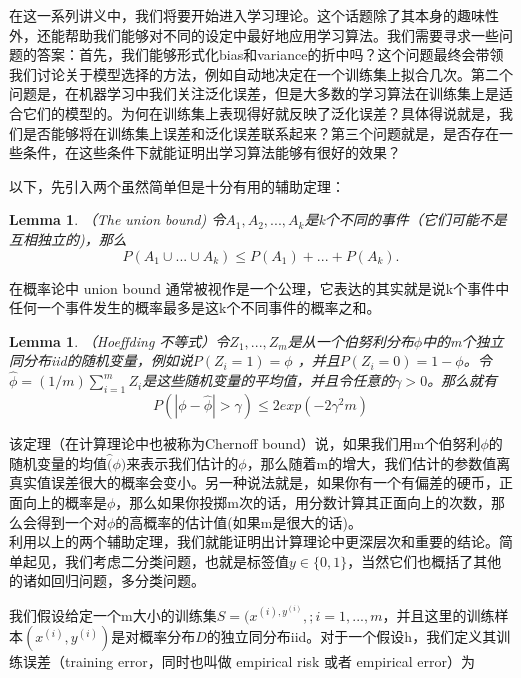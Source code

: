 \documentclass[UTF8]{ctexart}
\begin{document}
在这一系列讲义中，我们将要开始进入学习理论。这个话题除了其本身的趣味性外，还能帮助我们能够对不同的设定中最好地应用学习算法。我们需要寻求一些问题的答案：首先，我们能够形式化bias和variance的折中吗？这个问题最终会带领我们讨论关于模型选择的方法，例如自动地决定在一个训练集上拟合几次。第二个问题是，在机器学习中我们关注泛化误差，但是大多数的学习算法在训练集上是适合它们的模型的。为何在训练集上表现得好就反映了泛化误差？具体得说就是，我们是否能够将在训练集上误差和泛化误差联系起来？第三个问题就是，是否存在一些条件，在这些条件下就能证明出学习算法能够有很好的效果？

以下，先引入两个虽然简单但是十分有用的辅助定理：\\


\newtheorem{law1}{Lemma}[section]
\begin{law1} \label{law:box}
（The union bound) 令$A_{1},A_{2},...,A_{k}$是k个不同的事件（它们可能不是互相独立的)，那么\[ P(A_{1} \cup ...\cup A_{k} ) \leq P(A_{1})+...+P(A_{k}). \]
\end{law1}


在概率论中 union bound 通常被视作是一个公理，它表达的其实就是说k个事件中任何一个事件发生的概率最多是这k个不同事件的概率之和。

\newtheorem{law2}{Lemma}[section]
\begin{law2} \label{law:box}
 （Hoeffding 不等式）令$Z_{1},...,Z_{m}$是从一个伯努利分布$\phi$中的m个独立同分布iid的随机变量，例如说$P(Z_{i}=1)=\phi$ ，并且$P(Z_{i}=0)=1-\phi $。令$\hat{\phi}=(1/m)\sum_{i=1}^{m}Z_{i}$是这些随机变量的平均值，并且令任意的$\gamma > 0$。那么就有\[ P(|\phi-\hat{\phi}|>\gamma) \leq 2exp(-2\gamma^{2}m) \]
\end{law2}

该定理（在计算理论中也被称为Chernoff bound）说，如果我们用m个伯努利$\phi$的随机变量的均值$\hat(\phi)$来表示我们估计的$\phi$，那么随着m的增大，我们估计的参数值离真实值误差很大的概率会变小。另一种说法就是，如果你有一个有偏差的硬币，正面向上的概率是$\phi$，那么如果你投掷m次的话，用分数计算其正面向上的次数，那么会得到一个对$\phi$的高概率的估计值(如果m是很大的话)。
\\

利用以上的两个辅助定理，我们就能证明出计算理论中更深层次和重要的结论。简单起见，我们考虑二分类问题，也就是标签值$y \in \{ 0,1 \}$，当然它们也概括了其他的诸如回归问题，多分类问题。

我们假设给定一个m大小的训练集$S={(x^{(i),y^{(i)}},;i=1,...,m}$，并且这里的训练样本$(x^{(i)},y^{(i)})$是对概率分布$D$的独立同分布iid。对于一个假设h，我们定义其训练误差（training error，同时也叫做 empirical risk 或者 empirical error）为 
\end{document}
